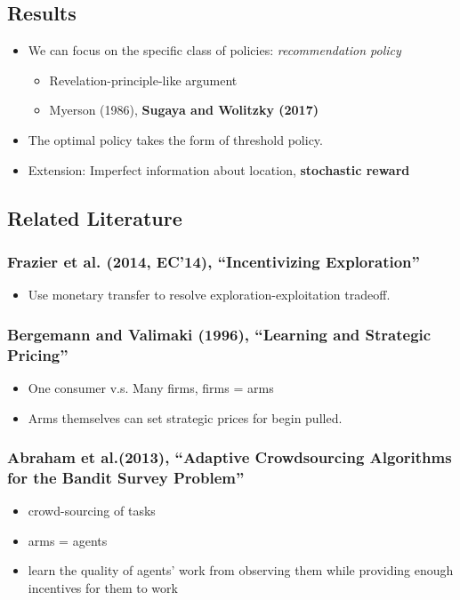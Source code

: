 \documentclass[11pt,a4paper,dvipdfmx]{article}
\newcommand{\1}{\mathbbm{1}}
\begin{document}
\subsection{Results}
\begin{itemize}
	\item We can focus on the specific class of policies: \textit{recommendation policy}
	\begin{itemize}
		\item Revelation-principle-like argument
		\item Myerson (1986), \textbf{Sugaya and Wolitzky (2017)}
	\end{itemize}
	\item The optimal policy takes the form of threshold policy.
	\item Extension: Imperfect information about location, \textbf{stochastic reward}
\end{itemize}

\subsection{Related Literature}
\subsubsection{Frazier et al. (2014, EC'14), ``Incentivizing Exploration''}
\begin{itemize}
	\item Use monetary transfer to resolve exploration-exploitation tradeoff.
\end{itemize}
\subsubsection{Bergemann and Valimaki (1996), ``Learning and Strategic Pricing''}
\begin{itemize}
	\item One consumer v.s. Many firms, firms = arms
	\item Arms themselves can set strategic prices for begin pulled.
\end{itemize}
\subsubsection{Abraham et al.(2013), ``Adaptive Crowdsourcing Algorithms for the Bandit Survey Problem''}
\begin{itemize}
	\item crowd-sourcing of tasks
	\item arms = agents
	\item learn the quality of agents' work from observing them while providing enough incentives for them to work
\end{itemize}
\end{document}
